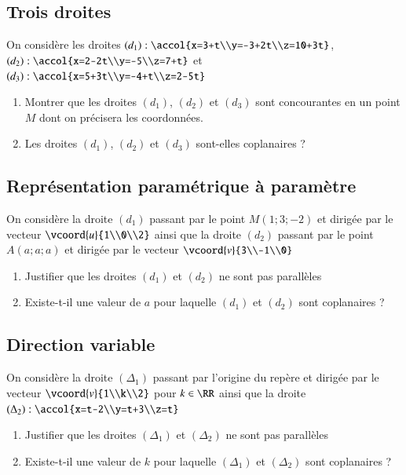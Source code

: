 \documentclass[oneside,12pt]{article}          %
\begin{document}
\subsection{Trois droites}
On considère les droites $(d_1):\accol{x=3+t\\y=-3+2t\\z=10+3t}$,\quad$(d_2):\accol{x=2-2t\\y=-5\\z=7+t}$ et $(d_3):\accol{x=5+3t\\y=-4+t\\z=2-5t}$
\begin{enumerate}
	\item Montrer que les droites $(d_1)$, $(d_2)$ et $(d_3)$ sont concourantes en un point $M$ dont on précisera les coordonnées.
	\item Les droites $(d_1)$, $(d_2)$ et $(d_3)$ sont-elles coplanaires ?
\end{enumerate}



\subsection{Représentation paramétrique à paramètre}
On considère la droite $(d_1)$ passant par le point $M(1;3;-2)$ et dirigée par le vecteur $\vcoord{u}{1\\0\\2}$ ainsi que la droite $(d_2)$ passant par le point $A(a;a;a)$ et dirigée par le vecteur $\vcoord{v}{3\\-1\\0}$
\begin{enumerate}
	\item Justifier que les droites $(d_1)$ et $(d_2)$ ne sont pas parallèles
    \item Existe-t-il une valeur de $a$ pour laquelle $(d_1)$ et $(d_2)$ sont coplanaires ?
\end{enumerate}



\subsection{Direction variable}
On considère la droite $(\Delta_1)$ passant par l'origine du repère et dirigée par le vecteur $\vcoord{v}{1\\k\\2}$ pour $k\in\RR$ ainsi que la droite $(\Delta_2): \accol{x=t-2\\y=t+3\\z=t}$
\begin{enumerate}
    \item Justifier que les droites $(\Delta_1)$ et $(\Delta_2)$ ne sont pas parallèles
	\item Existe-t-il une valeur de $k$ pour laquelle $(\Delta_1)$ et $(\Delta_2)$ sont coplanaires ?
\end{enumerate}
\end{document}
